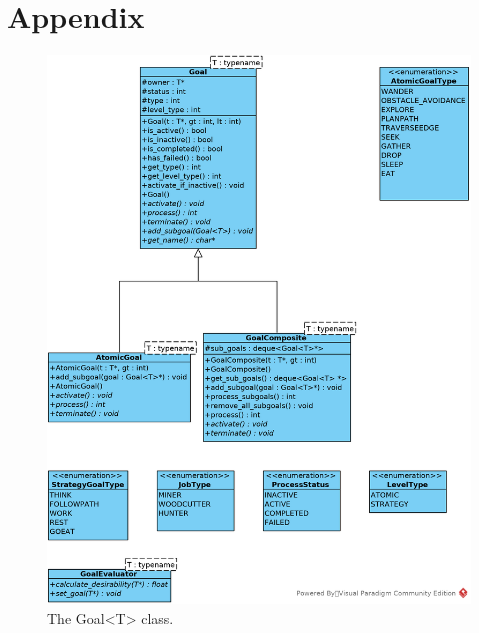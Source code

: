\section{Appendix}

\begin{figure}[!htb]
    \centering
    \includegraphics[scale=0.75]{res/Goal.jpg}
    \caption{The Goal<T> class.}\label{fig:goal}
\end{figure}

